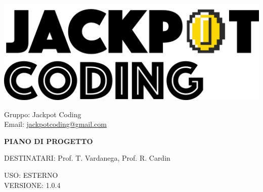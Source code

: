 \documentclass[5pt]{article}
\begin{document}
\begin{minipage}[t]{0.50\textwidth}
    \begin{flushleft}
        \hspace{10pt}
        \includegraphics[scale=0.65]{jackpot-logo.png} 
    \end{flushleft}
\end{minipage}
\hspace{-60pt} %
\begin{flushright}
    \begin{minipage}[t]{0.50\textwidth}
        \begin{flushright}
            Gruppo: {\Large Jackpot Coding}\\
            Email: \href{mailto:jackpotcoding@gmail.com}{jackpotcoding@gmail.com}
        \end{flushright}
    \end{minipage}
\end{flushright}

\vspace{24pt}

\begin{center}
    \textbf{\LARGE PIANO DI PROGETTO}
\end{center}

\vspace{13pt}

\begin{flushleft}
    \begin{spacing}{1.5}
        DESTINATARI: Prof. T. Vardanega, Prof. R. Cardin\\%
    \end{spacing}
\end{flushleft}

\begin{flushright}
    \begin{spacing}{1}
        USO: ESTERNO\\
        VERSIONE: 1.0.4\\
    \end{spacing}
\end{flushright}
\end{document}
